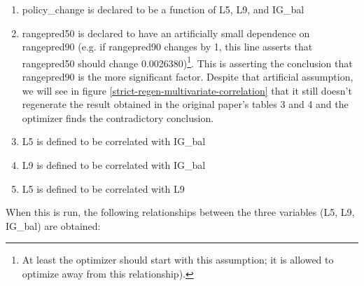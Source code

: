 \documentclass[]{article}
\begin{document}
\begin{enumerate}
	This "net interest group alignment" is then normalized between 0 and 1 to yield IG\_bal:
	\[ \text{IG\_bal} = \text{normalize}(\text{net interest group alignment}) \]
	\item policy\_change is declared to be a function of L5, L9, and IG\_bal
	\item rangepred50 is declared to have an artificially small dependence on rangepred90 (e.g. if rangepred90 changes by 1, this line asserts that rangepred50 should change 0.0026380)\footnote{At least the optimizer should start with this assumption; it is allowed to optimize away from this relationship).}. This is asserting the conclusion that rangepred90 is the more significant factor. Despite that artificial assumption, we will see in figure \ref{strict-regen-multivariate-correlation} that it still doesn't regenerate the result obtained in the original paper's tables 3 and 4 and the optimizer finds the contradictory conclusion.
	\item L5 is defined to be correlated with IG\_bal
	\item L9 is defined to be correlated with IG\_bal
	\item L5 is defined to be correlated with L9
\end{enumerate}
When this is run, the following relationships between the three variables (L5, L9, IG\_bal) are obtained:
\end{document}
